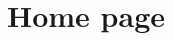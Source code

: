 \documentclass[../../DD.tex]{subfiles}
\begin{document}
\section{Home page \label{sect:2.1}}


	
\end{document}
